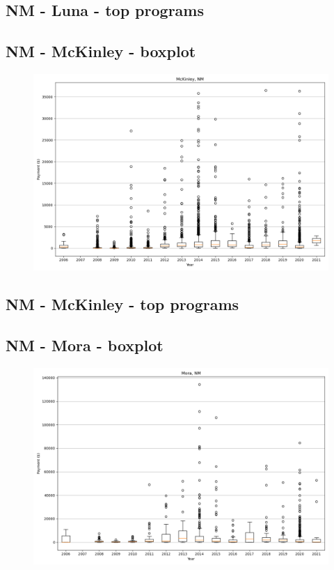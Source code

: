 \subsection*{NM - Luna - top programs}

\newpage
\subsection*{NM - McKinley - boxplot}
\begin{figure}[h]
\centering
\includegraphics[width=7in]{../output/boxplots/counties/McKinley-NM_boxplot.png}
\end{figure}


\subsection*{NM - McKinley - top programs}

\newpage
\subsection*{NM - Mora - boxplot}
\begin{figure}[h]
\centering
\includegraphics[width=7in]{../output/boxplots/counties/Mora-NM_boxplot.png}
\end{figure}


